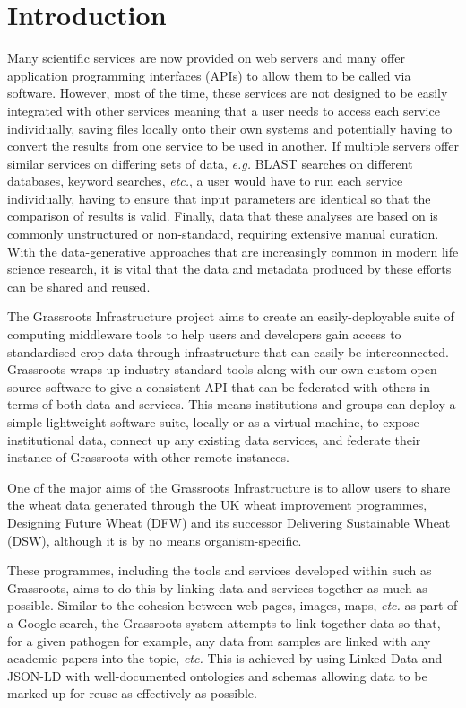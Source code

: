 \documentclass[9pt,a4paper]{extarticle}
\begin{document}
\clearpage
\pagestyle{main}
\section*{Introduction}

Many scientific services are now provided on web servers and many offer application programming interfaces (APIs) to allow them to be called via software. 
However, most of the time, these services are not designed to be easily integrated with other services meaning that a user needs to access each service individually, saving files locally onto their own systems and potentially having to convert the results from one service to be used in another. 
If multiple servers offer similar services on differing sets of data, \textit{e.g.} BLAST searches on different databases, keyword searches, \textit{etc.}, a user would have to run each service individually, having to ensure that input parameters are identical so that the comparison of results is valid. 
Finally, data that these analyses are based on is commonly unstructured or non-standard, requiring extensive manual curation.
With the data-generative approaches that are increasingly common in modern life science research, it is vital that the data and metadata produced by these efforts can be shared and reused.

The Grassroots Infrastructure project aims to create an easily-deployable suite of computing middleware tools to help users and developers gain access to standardised crop data through infrastructure that can easily be interconnected.
Grassroots wraps up industry-standard tools along with our own custom open-source software to give a consistent API that can be federated with others in terms of both data and services.
This means institutions and groups can deploy a simple lightweight software suite, locally or as a virtual machine, to expose institutional data, connect up any existing data services, and federate their instance of Grassroots with other remote instances.

One of the major aims of the Grassroots Infrastructure is to allow users to share the wheat data generated through the UK wheat improvement programmes, Designing Future Wheat (DFW) and its successor Delivering Sustainable Wheat (DSW), although it is by no means organism-specific.

These programmes, including the tools and services developed within such as Grassroots, aims to do this by linking data and services together as much as possible. Similar to the cohesion between web pages, images, maps, \textit{etc.} as part of a Google search, the Grassroots system attempts to link together data so that, for a given pathogen for example, any data from samples are linked with any academic papers into the topic, \textit{etc.}
This is achieved by using Linked Data and JSON-LD with well-documented ontologies and schemas allowing data to be marked up for reuse as effectively as possible.
\end{document}

